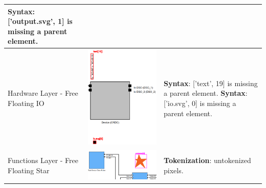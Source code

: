 \begin{longtable}{p{} >{\raggedright\arraybackslash}m{} >{\raggedright\arraybackslash}m{}}
        \textbf{Syntax}: ['output.svg', 1] is missing a parent element.\\
    \midrule
    Hardware Layer - Free Floating IO & \includegraphics[width=\linewidth]{pictures/41_free_floating_input_output_clip.png} & \textbf{Syntax}: ['text', 19] is missing a parent element. \newline
        \textbf{Syntax}: ['io.svg', 0] is missing a parent element. \\
    \midrule
    Functions Layer - Free Floating Star & \includegraphics[width=\linewidth]{pictures/42_free_floating_star_output_clip.png} & \textbf{Tokenization}: untokenized pixels. \\

\end{longtable}

